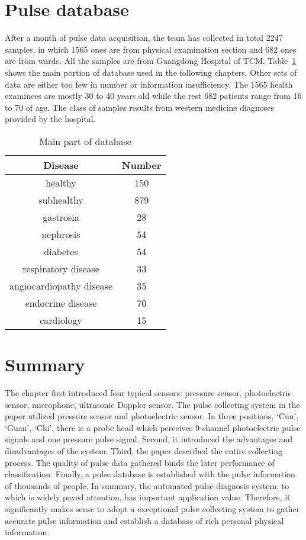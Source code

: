 \section{Pulse database}
After a month of pulse data acquisition, the team has collected 
in total 2247 samples, in which 1565 ones are from physical
examination section and 682 ones are from wards. All the samples are
from Guangdong Hospital of TCM. Table~\ref{tab:database} shows the
main portion of database used in the following chapters. Other sets of
data are either too few in number or information insufficiency. 
The 1565 health examinees are mostly 30 to 40 years old while the rest
682 patients range from 16 to 70 of age. The class of samples results from
western medicine diagnoses provided by the hospital. 
\begin{table}
    \centering
    \begin{tabular}{cc}
        \toprule[1.5pt]
        Disease & Number \\
        \midrule[1pt]
        healthy & 150 \\
        subhealthy & 879 \\
        gastrosia & 28 \\
        nephrosis & 54 \\
        diabetes & 54 \\
        respiratory disease & 33 \\
        angiocardiopathy disease & 35 \\
        endocrine disease & 70 \\
        cardiology & 15 \\
        \bottomrule[1.5pt]
    \end{tabular}
    \caption{Main part of database}
    \label{tab:database}
\end{table}

\section{Summary}
The chapter first introduced four typical sensors: pressure sensor,
photoelectric sensor, microphone, ultrasonic Doppler sensor. The pulse
collecting system in the paper utilized pressure sensor and
photoelectric sensor. In three positions, `Cun', `Guan', `Chi', there
is a probe head which perceives 9-channel photoelectric pulse signals
and one pressure pulse signal. Second, it introduced the advantages and
disadvantages of the system. Third, the paper described the entire collecting
process. The quality of pulse data gathered binds the later
performance of classification. Finally, a pulse database is
established with the pulse information of thousands of people. 
In summary, the automated pulse diagnosis system, to which is widely
payed attention, has important application value. 
Therefore, it significantly makes sense to adopt a exceptional
pulse collecting system to gather accurate pulse information 
and establish a database of rich personal physical information. 

